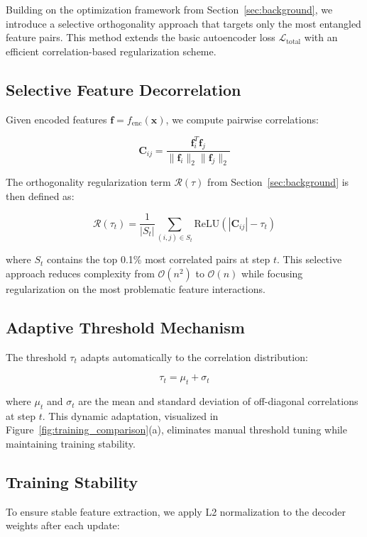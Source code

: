 \documentclass{article} %
\begin{document}
Building on the optimization framework from Section~\ref{sec:background}, we introduce a selective orthogonality approach that targets only the most entangled feature pairs. This method extends the basic autoencoder loss $\mathcal{L}_{\text{total}}$ with an efficient correlation-based regularization scheme.

\subsection{Selective Feature Decorrelation}
Given encoded features $\mathbf{f} = f_{\text{enc}}(\mathbf{x})$, we compute pairwise correlations:

\begin{equation}
    \mathbf{C}_{ij} = \frac{\mathbf{f}_i^T \mathbf{f}_j}{\|\mathbf{f}_i\|_2 \|\mathbf{f}_j\|_2}
\end{equation}

The orthogonality regularization term $\mathcal{R}(\tau)$ from Section~\ref{sec:background} is then defined as:

\begin{equation}
    \mathcal{R}(\tau_t) = \frac{1}{|S_t|} \sum_{(i,j) \in S_t} \text{ReLU}(|\mathbf{C}_{ij}| - \tau_t)
\end{equation}

where $S_t$ contains the top 0.1\% most correlated pairs at step $t$. This selective approach reduces complexity from $\mathcal{O}(n^2)$ to $\mathcal{O}(n)$ while focusing regularization on the most problematic feature interactions.

\subsection{Adaptive Threshold Mechanism}
The threshold $\tau_t$ adapts automatically to the correlation distribution:

\begin{equation}
    \tau_t = \mu_t + \sigma_t
\end{equation}

where $\mu_t$ and $\sigma_t$ are the mean and standard deviation of off-diagonal correlations at step $t$. This dynamic adaptation, visualized in Figure~\ref{fig:training_comparison}(a), eliminates manual threshold tuning while maintaining training stability.

\subsection{Training Stability}
To ensure stable feature extraction, we apply L2 normalization to the decoder weights after each update:
\end{document}

